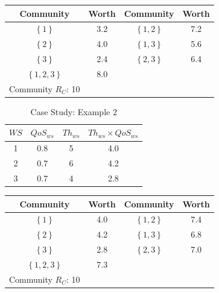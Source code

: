 \begin{table}[!t]
\renewcommand{\arraystretch}{1.3}
\label{example_1_2}
\centering
\begin{tabular}{c c || c c}
\hline
Community & Worth & Community & Worth\\
\hline
$\left\{1\right\}$ & 3.2 & $\left\{1,2\right\}$ & 7.2\\
$\left\{2\right\}$ & 4.0 & $\left\{1,3\right\}$ & 5.6\\
$\left\{3\right\}$ & 2.4 & $\left\{2,3\right\}$ & 6.4\\
$\left\{1,2,3\right\}$ & 8.0\\
\hline
Community $R_C$: 10\\
\hline
\end{tabular}
\end{table}

\begin{table}[!t]
\renewcommand{\arraystretch}{1.3}
\caption{Case Study: Example 2}
\label{example_2}
\centering
\begin{tabular}{c c c c}
\hline
$WS$ & $QoS_{ws}$ & $Th_{ws}$ & $Th_{ws} \times QoS_{ws}$\\
\hline
1 & 0.8 & 5 & 4.0\\
2 & 0.7 & 6 & 4.2\\
3 & 0.7 & 4 & 2.8\\
\hline
\end{tabular}
\end{table}

\begin{table}[!t]
\renewcommand{\arraystretch}{1.3}
\label{example_2_2}
\centering
\begin{tabular}{c c || c c}
\hline
Community & Worth & Community & Worth\\
\hline
$\left\{1\right\}$ & 4.0 & $\left\{1,2\right\}$ & 7.4\\
$\left\{2\right\}$ & 4.2 & $\left\{1,3\right\}$ & 6.8\\
$\left\{3\right\}$ & 2.8 & $\left\{2,3\right\}$ & 7.0\\
$\left\{1,2,3\right\}$ & 7.3\\
\hline
Community $R_C$: 10\\
\hline
\end{tabular}
\end{table}


